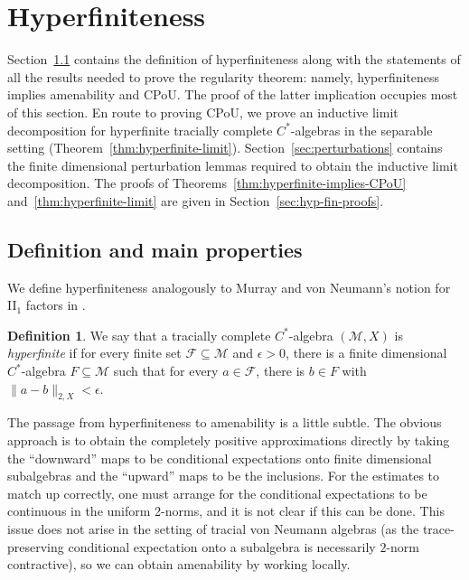 \documentclass[a4paper,11pt]{amsart}
\theoremstyle{definition}
\newtheorem{definition}[theorem]{Definition}
\numberwithin{equation}{section}
\numberwithin{theorem}{section}
\newcommand{\M}{\mathcal{M}}
\begin{document}
\section{Hyperfiniteness}\label{sec:hyperfinite}

 
	
	
	Section~\ref{sec:hyp-fin-statements} contains the definition of hyperfiniteness along with the statements of all the results needed to prove the regularity theorem: namely, hyperfiniteness implies {}amenability and CPoU.  The proof of the latter implication occupies most of this section.  En route to proving CPoU, we prove an inductive limit decomposition for hyperfinite tracially complete $C^*$-algebras in the separable setting (Theorem~\ref{thm:hyperfinite-limit}).  Section~\ref{sec:perturbations} contains the finite dimensional perturbation lemmas required to obtain the inductive limit decomposition. The proofs of Theorems~\ref{thm:hyperfinite-implies-CPoU} and~\ref{thm:hyperfinite-limit} are given in Section~\ref{sec:hyp-fin-proofs}.
	
	\subsection{Definition and main properties}\label{sec:hyp-fin-statements}
	
	We define hyperfiniteness analogously to Murray and von Neumann's notion for II$_1$ factors in \cite{MvN43}.
	
	\begin{definition}
		\label{def:hyperfinite}
		We say that a tracially complete $C^*$-algebra $(\mathcal M, X)$ is \emph{hyperfinite} if for every finite set $\mathcal F \subseteq \mathcal M$ and $\epsilon > 0$, there is a finite dimensional $C^*$-algebra $F \subseteq \M$ such that for every $a \in \mathcal F$, there is  $b \in F$ with $\|a - b\|_{2, X} < \epsilon$.
	\end{definition}
	
	The passage from hyperfiniteness to {}amenability is a little subtle.  The obvious approach is to obtain the completely positive approximations directly by taking the ``downward'' maps to be conditional expectations onto finite dimensional subalgebras and the ``upward'' maps to be the inclusions.  For the estimates to match up correctly, one must arrange for the conditional expectations to be continuous in the uniform 2-norms, and it is not clear if this can be done. This issue does not arise in the setting of tracial von Neumann algebras (as the trace-preserving conditional expectation onto a subalgebra is necessarily $2$-norm contractive), so we can obtain {}amenability by working locally.
	
\end{document}
